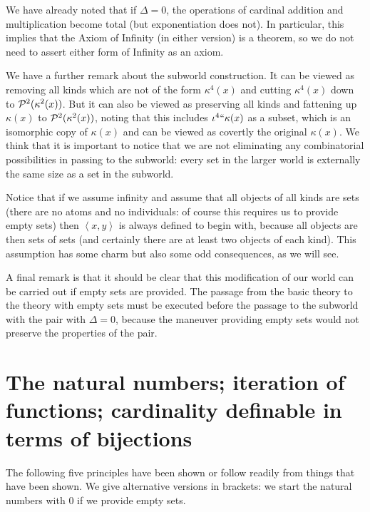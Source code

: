 \documentclass[12pt]{article}
\begin{document}
We have already noted that if $\Delta=0$, the operations of cardinal addition and multiplication become total (but exponentiation does not).  In particular, this implies that the Axiom of Infinity (in either version) is a theorem, so we do not need to assert either form of Infinity as an axiom.

We have a further remark about the subworld construction.  It can be viewed as removing all kinds which are not of the form $\kappa^4(x)$ and cutting $\kappa^4(x)$ down to ${\cal P}^2(\kappa^2(x))$.  But it can also be viewed
as preserving all kinds and fattening up $\kappa(x)$ to ${\cal P}^2(\kappa^2(x))$, noting that this includes $\iota^4``\kappa(x)$ as a subset, which is an isomorphic copy of $\kappa(x)$ and can be viewed as covertly the original $\kappa(x)$.  We think that it is important to notice that we are not eliminating any combinatorial possibilities in passing to the subworld:  every set in the larger world is externally the same size as a set in the subworld.

Notice that if we assume infinity and assume that all objects of all kinds are sets (there are no atoms and no individuals:  of course this requires us to provide empty sets) then $\left<x,y\right>$ is always defined to begin with, because all objects are then sets of sets (and certainly there are at least two objects of each kind).  This assumption has some charm but also some odd consequences, as we will see.

A final remark is that it should be clear that this modification of our world can be carried out if empty sets are provided.  The passage from the basic theory to the theory with empty sets must be executed before the passage to the subworld with the pair with $\Delta=0$, because the maneuver providing empty sets would not preserve the properties of the pair.

\newpage

\section{The natural numbers;  iteration of functions;  cardinality definable in terms of bijections}

The following five principles have been shown or follow readily from things that have been shown.  We give alternative versions in brackets:  we start the natural numbers with 0 if we provide empty sets.
\end{document}
